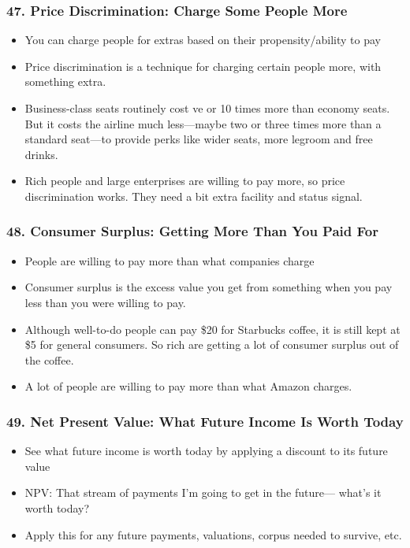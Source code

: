 \begin{frame}[fragile]
\frametitle{47. Price Discrimination: Charge Some People More}
\begin{itemize}
\item You can charge people for extras based on their propensity/ability to pay
\item Price discrimination is a technique for charging certain people more, with something extra.
\item Business-class seats routinely cost  ve or 10 times more than economy seats. But it costs the airline
much less—maybe two or three times more than a standard seat—to provide perks like wider seats, more
legroom and free drinks.
\item Rich people and large enterprises are willing to pay more, so price discrimination works. They need a bit extra facility and status signal.
\end{itemize}
\end{frame}

\begin{frame}[fragile]
\frametitle{48. Consumer Surplus: Getting More Than You Paid For}
\begin{itemize}
\item People are willing to pay more than what companies charge
\item Consumer surplus is the excess
value you get from something when you pay less than you were willing to pay.
\item Although well-to-do people can pay \$20 for Starbucks coffee, it is still kept at \$5 for general consumers. So rich are  getting a lot of consumer surplus out of the coffee.  
\item A lot of
people are willing to pay more than what Amazon charges.
\end{itemize}
\end{frame}

\begin{frame}[fragile]
\frametitle{49. Net Present Value: What Future Income Is Worth Today}
\begin{itemize}
\item See what future income is worth today by applying a discount to its future value
\item NPV: That stream of payments I’m going to get in the future—
what’s it worth today?
\item Apply this for any future payments, valuations, corpus needed to survive, etc.
\end{itemize}
\end{frame}

